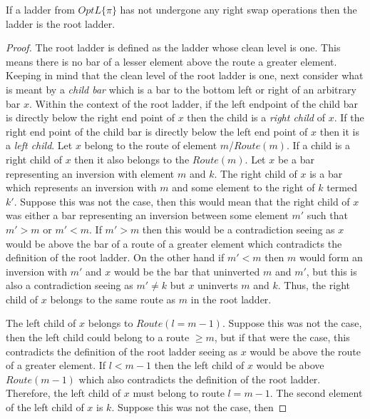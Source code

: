  \begin{theorem}
	 If a ladder from $OptL\{\pi\}$ has not undergone any right swap operations then the ladder is the root ladder. 
	 \label{Theorem:One}
 \end{theorem} 
 \begin{proof}
     The root ladder is defined as the ladder whose clean level is one.
     This means there is no bar of a lesser element above the route a 
     greater element. Keeping in mind that the clean level of the root ladder is one, next consider what is meant by a \emph{child bar}
      which is a bar to the bottom left or right of an arbitrary bar $x$. Within the context of the root ladder, 
      if the left endpoint of the child bar is directly below the right end point of $x$ then the child is a 
     \emph{right child} of $x$. If the right end point of the child bar is directly 
     below the left end point of $x$ then it is a \emph{left child}. Let $x$ belong to the route of element $m$/$Route(m)$.
     If a child is a right child of $x$
	 then it also belongs to the $Route(m)$.
     Let $x$ be a bar representing an inversion with element $m$ and $k$.
     The right child of $x$ is a bar which represents an inversion 
     with $m$ and some element to the right of $k$ termed $k'$. Suppose this was not the case, 
     then this would mean that the right child of $x$ was either a bar representing an inversion 
	 between some element $m'$ such that $m' > m$ or $m' < m$. If $m' > m$ 
	 then this would be a contradiction seeing as $x$ would be above the bar of a route 
     of a greater element which contradicts the definition of the root ladder. On the other hand if 
	 $m' < m$ then $m$ would form an inversion with $m'$ and $x$ would be the bar that uninverted $m$ and $m'$, 
	 but this is also a contradiction seeing as $m' \neq k$ but $x$ uninverts $m$ and $k$. Thus, the right child 
     of $x$ belongs to the same route as $m$ in the root ladder.\par The left child of $x$
     belongs to $Route(l=m-1)$. Suppose this was not the case, 
     then the left child could belong to a route $\geq m$, but if that were the case, this contradicts 
	 the definition of the root ladder seeing as $x$ would be above the route of a greater element. If 
	 $l < m-1$ then the left child of $x$ would be above $Route(m-1)$ which also contradicts the definition 
	 of the root ladder. Therefore, the left child of $x$ must belong to route $l=m-1$. 
	 The second element of the left child of $x$ is $k$. Suppose this was not the case, then 

\end{proof}
